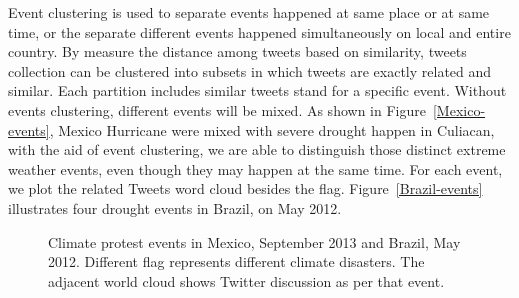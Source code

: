 Event clustering is used to separate events happened at same place or at same time, or the separate different events happened simultaneously on local and entire country. By measure the distance among tweets based on similarity, tweets collection can be clustered into subsets in which tweets are exactly related and similar. Each partition includes similar tweets stand for a specific event. Without events clustering, different events will be mixed. As shown in Figure~\ref{Mexico-events}, Mexico Hurricane were mixed with severe drought happen in Culiacan, with the aid of event clustering, we are able to distinguish those distinct extreme weather events, even though they may happen at the same time. For each event, we plot the related Tweets word cloud besides the flag. Figure~\ref{Brazil-events} illustrates four drought events in Brazil, on May 2012.

\begin{figure}[th]
	\centering
	\caption{Climate protest events in Mexico, September 2013 and Brazil, May 2012. Different flag represents different climate disasters. The adjacent world cloud shows Twitter discussion as per that event. }
\label{Twitter-events}
\end{figure}


